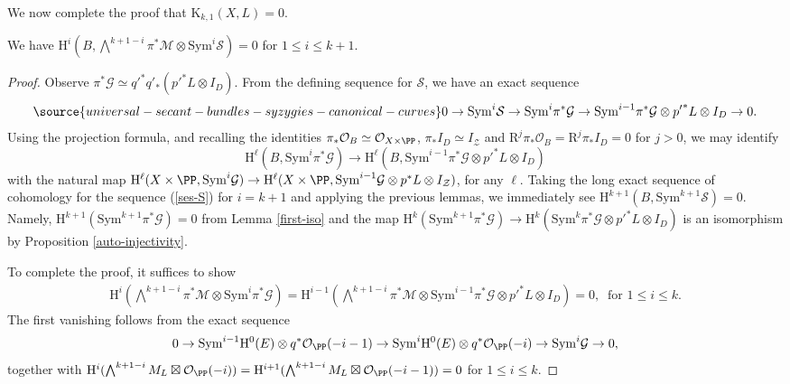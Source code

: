 We now complete the proof that $\mathrm{K}_{k,1}(X,L)=0$.
\begin{thm}
\notready \label{main-thm}
We have $\mathrm{H}^i(B, \bigwedge^{k+1-i} \pi^* \mathcal{M} \otimes \mathrm{Sym}^i \mathcal{S})=0$ for $1 \leq i \leq k+1$.
\end{thm}
\begin{proof}
Observe $\pi^*\mathcal{G}\simeq {q'}^*q'_*({p'}^*L \otimes I_{D})$. From the defining sequence for $\mathcal{S}$, we have an exact sequence
\begin{align} \label{ses-S}
\source{universal-secant-bundles-syzygies-canonical-curves}
0 \to \mathrm{Sym}^{i}\mathcal{S} \to \mathrm{Sym}^{i} \pi^* \mathcal{G} \to \mathrm{Sym}^{i-1} \pi^*\mathcal{G} \otimes {p'}^*L \otimes I_{D} \to 0.
\end{align}
Using the projection formula, and recalling the identities $\pi_*\mathcal{O}_B \simeq \mathcal{O}_{X \times \PP}$, $\pi_* I_{D} \simeq I_{\mathcal{Z}}$ and $\mathrm{R}^j \pi_*\mathcal{O}_B=\mathrm{R}^j\pi_* I_D=0$ for $j>0$,  we may identify
$$\mathrm{H}^{\ell}(B, \mathrm{Sym}^{i} \pi^* \mathcal{G}) \to \mathrm{H}^{\ell}(B,\mathrm{Sym}^{i-1} \pi^*\mathcal{G} \otimes {p'}^*L \otimes I_{D})$$
with the natural map $\mathrm{H}^{\ell}(X \times \PP, \mathrm{Sym}^{i} \mathcal{G}) \to \mathrm{H}^{\ell}(X \times \PP,\mathrm{Sym}^{i-1} \mathcal{G} \otimes {p}^*L \otimes I_{\mathcal{Z}})$, for any $\ell$. Taking the long exact sequence of cohomology for the sequence (\ref{ses-S}) for $i=k+1$ and applying the previous lemmas, we immediately see $ \mathrm{H}^{k+1}(B,\mathrm{Sym}^{k+1} \mathcal{S})=0.$ Namely, $\mathrm{H}^{k+1}(\mathrm{Sym}^{k+1}\pi^* \mathcal{G})=0$ from Lemma \ref{first-iso} and the map $\mathrm{H}^k(\mathrm{Sym}^{k+1} \pi^* \mathcal{G}) \to \mathrm{H}^k(\mathrm{Sym}^{k}\pi^* \mathcal{G}  \otimes {p'}^*L \otimes I_{D} )$ is an isomorphism by Proposition \ref{auto-injectivity}.


To complete the proof, it suffices to show
\begin{align*}
\mathrm{H}^i (\bigwedge^{k+1-i} \pi^* \mathcal{M} \otimes \mathrm{Sym}^{i} \pi^* \mathcal{G})=\mathrm{H}^{i-1}(\bigwedge^{k+1-i} \pi^* \mathcal{M} \otimes \mathrm{Sym}^{i-1} \pi^* \mathcal{G} \otimes {p'}^*L \otimes I_{D} )=0, \; \; \text{for $1 \leq i \leq k$}.
\end{align*}
The first vanishing follows from the exact sequence
$$0 \to \mathrm{Sym}^{i-1} \mathrm{H}^0(E) \otimes q^*\mathcal{O}_{\PP}(-i-1) \to \mathrm{Sym}^{i}\mathrm{H}^0(E) \otimes q^*\mathcal{O}_{\PP}(-i) \to \mathrm{Sym}^{i}\mathcal{G}\to 0,$$
together with $\mathrm{H}^i(\bigwedge^{k+1-i} M_L \boxtimes \mathcal{O}_{\PP}(-i))=\mathrm{H}^{i+1}(\bigwedge^{k+1-i}M_L \boxtimes \mathcal{O}_{\PP}(-i-1))=0$ for $1 \leq i \leq k$.


\end{proof}

